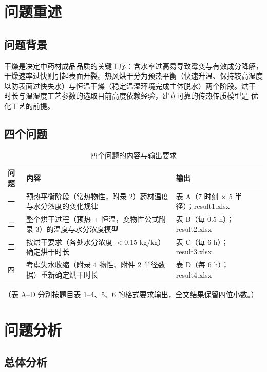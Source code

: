 \section{问题重述}

\subsection{问题背景}

干燥是决定中药材成品品质的关键工序：含水率过高易导致霉变与有效成分降解，
干燥速率过快则引起表面开裂。热风烘干分为预热平衡（快速升温、保持较高湿度
以防表面过快失水）与恒温干燥（稳定温湿环境完成主体脱水）两个阶段。烘干
时长与温湿度工艺参数的选取目前高度依赖经验，建立可靠的传热传质模型是
优化工艺的前提\cite{bialobrzewski,luikov}。

\subsection{四个问题}

\begin{table}[H]
\centering
\caption{四个问题的内容与输出要求}
\begin{tabular}{p{1.2cm}p{8.6cm}p{4.4cm}}
\toprule
问题 & 内容 & 输出 \\
\midrule
一 & 预热平衡阶段（常热物性，附录 2）药材温度与水分浓度的变化规律 & 表 A（7 时刻 $\times$ 5 半径）；result1.xlsx \\
二 & 整个烘干过程（预热 + 恒温，变物性公式附录 3）的温度与水分浓度模型 & 表 B（每 0.5 h）；result2.xlsx \\
三 & 按烘干要求（各处水分浓度 $<0.15$ kg/kg）确定烘干时长 & 表 C（每 6 h）；result3.xlsx \\
四 & 考虑失水收缩（附录 4 物性、附件 2 半径数据）重新确定烘干时长 & 表 D（每 6 h）；result4.xlsx \\
\bottomrule
\end{tabular}
\end{table}

（表 A--D 分别按题目表 1--4、5、6 的格式要求输出，全文结果保留四位小数。）

\section{问题分析}

\subsection{总体分析}

